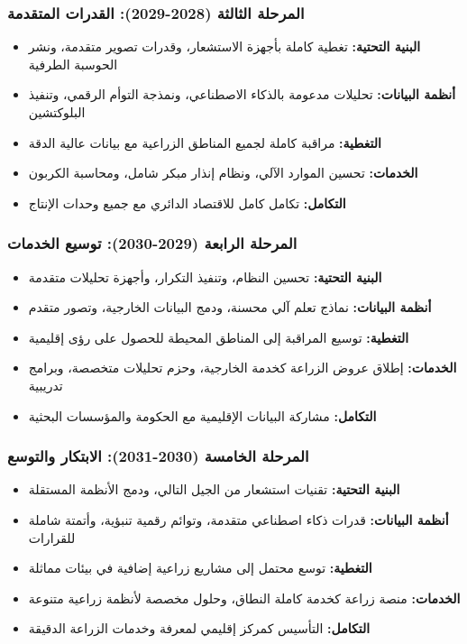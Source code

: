 \subsubsection{المرحلة الثالثة (2028-2029): القدرات المتقدمة}
\begin{itemize}
    \item \textbf{البنية التحتية:} تغطية كاملة بأجهزة الاستشعار، وقدرات تصوير متقدمة، ونشر الحوسبة الطرفية
    \item \textbf{أنظمة البيانات:} تحليلات مدعومة بالذكاء الاصطناعي، ونمذجة التوأم الرقمي، وتنفيذ البلوكتشين
    \item \textbf{التغطية:} مراقبة كاملة لجميع المناطق الزراعية مع بيانات عالية الدقة
    \item \textbf{الخدمات:} تحسين الموارد الآلي، ونظام إنذار مبكر شامل، ومحاسبة الكربون
    \item \textbf{التكامل:} تكامل كامل للاقتصاد الدائري مع جميع وحدات الإنتاج
\end{itemize}

\subsubsection{المرحلة الرابعة (2029-2030): توسيع الخدمات}
\begin{itemize}
    \item \textbf{البنية التحتية:} تحسين النظام، وتنفيذ التكرار، وأجهزة تحليلات متقدمة
    \item \textbf{أنظمة البيانات:} نماذج تعلم آلي محسنة، ودمج البيانات الخارجية، وتصور متقدم
    \item \textbf{التغطية:} توسيع المراقبة إلى المناطق المحيطة للحصول على رؤى إقليمية
    \item \textbf{الخدمات:} إطلاق عروض الزراعة كخدمة الخارجية، وحزم تحليلات متخصصة، وبرامج تدريبية
    \item \textbf{التكامل:} مشاركة البيانات الإقليمية مع الحكومة والمؤسسات البحثية
\end{itemize}

\subsubsection{المرحلة الخامسة (2030-2031): الابتكار والتوسع}
\begin{itemize}
    \item \textbf{البنية التحتية:} تقنيات استشعار من الجيل التالي، ودمج الأنظمة المستقلة
    \item \textbf{أنظمة البيانات:} قدرات ذكاء اصطناعي متقدمة، وتوائم رقمية تنبؤية، وأتمتة شاملة للقرارات
    \item \textbf{التغطية:} توسع محتمل إلى مشاريع زراعية إضافية في بيئات مماثلة
    \item \textbf{الخدمات:} منصة زراعة كخدمة كاملة النطاق، وحلول مخصصة لأنظمة زراعية متنوعة
    \item \textbf{التكامل:} التأسيس كمركز إقليمي لمعرفة وخدمات الزراعة الدقيقة
\end{itemize}

